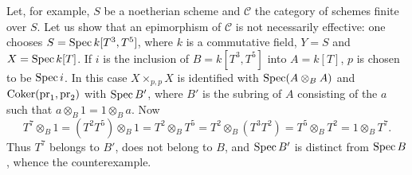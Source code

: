 Let, for example, $S$ be a noetherian scheme and $\mathcal C$ the category of schemes finite over $S$. Let us show that an epimorphism of $\mathcal C$ is not necessarily effective: one chooses $S=\operatorname{Spec} k[T^3,T^5]$, where $k$ is a commutative field, $Y=S$ and $X=\operatorname{Spec} k[T]$. If $i$ is the inclusion of $B=k[T^3,T^5]$ into $A=k[T]$, $p$ is chosen to be $\operatorname{Spec} i$. In this case $X\times_{p,p}X$ is identified with $\operatorname{Spec}(A\otimes_B A)$ and $\operatorname{Coker}(\mathrm{pr}_1,\mathrm{pr}_2)$ with $\operatorname{Spec} B'$, where $B'$ is the subring of $A$ consisting of the $a$ such that $a\otimes_B1=1\otimes_Ba$. Now
\[
T^7\otimes_B1=(T^2T^5)\otimes_B1=T^2\otimes_BT^5=T^2\otimes_B(T^3T^2)=T^5\otimes_BT^2=1\otimes_BT^7.
\]
Thus $T^7$ belongs to $B'$, does not belong to $B$, and $\operatorname{Spec} B'$ is distinct from $\operatorname{Spec} B$, whence the counterexample.
